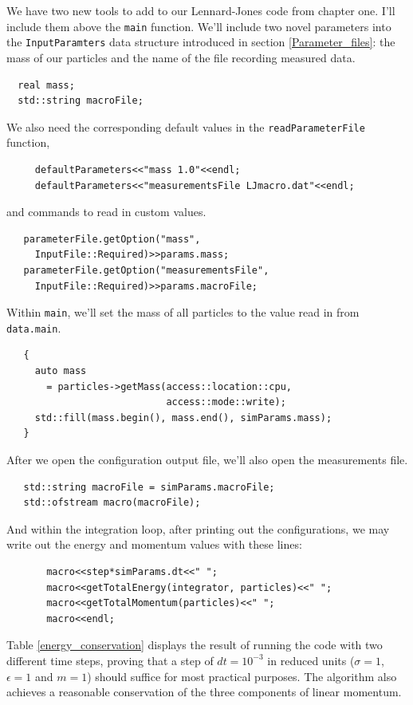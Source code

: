 We have two new tools to add to our Lennard-Jones code from chapter one. I'll 
include them above the \texttt{main} function. We'll include two novel 
parameters into the \texttt{InputParamters} data structure introduced in section 
\ref{Parameter_files}: the mass of our particles and the name of the file 
recording measured data.
\begin{lstlisting}
  real mass;
  std::string macroFile;
\end{lstlisting}
We also need the corresponding default values in the \texttt{readParameterFile} 
function,
\begin{lstlisting}
     defaultParameters<<"mass 1.0"<<endl;
     defaultParameters<<"measurementsFile LJmacro.dat"<<endl;
\end{lstlisting}
and commands to read in custom values.
\begin{lstlisting}
   parameterFile.getOption("mass",
     InputFile::Required)>>params.mass;
   parameterFile.getOption("measurementsFile",
     InputFile::Required)>>params.macroFile;
\end{lstlisting}
Within \texttt{main}, we'll set the mass of all particles to the value read in 
from \texttt{data.main}.
\begin{lstlisting}
   {
     auto mass
       = particles->getMass(access::location::cpu,
                            access::mode::write);
     std::fill(mass.begin(), mass.end(), simParams.mass);
   }
\end{lstlisting}
After we open the configuration output file, we'll also open the measurements 
file.
\begin{lstlisting}
   std::string macroFile = simParams.macroFile;
   std::ofstream macro(macroFile);
\end{lstlisting}
And within the integration loop, after printing out the configurations, we may 
write out the energy and momentum values with these lines:
\begin{lstlisting}
       macro<<step*simParams.dt<<" ";
       macro<<getTotalEnergy(integrator, particles)<<" ";
       macro<<getTotalMomentum(particles)<<" ";
       macro<<endl;
\end{lstlisting}

Table \ref{energy_conservation} displays the result of running the code with two 
different time steps, proving that a step of $dt = 10^{-3}$ in reduced units 
($\sigma = 1$, $\epsilon = 1$ and $m = 1$) should suffice for most practical 
purposes. The algorithm also achieves a reasonable conservation of the three 
components of linear momentum.

